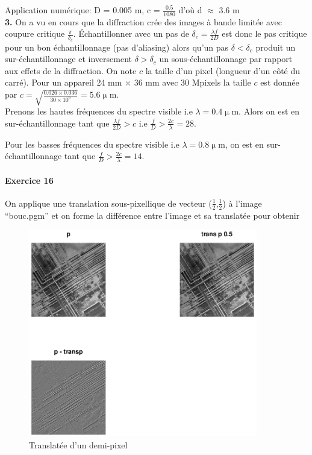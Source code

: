 \documentclass[a4paper, 11pt]{article}
\begin{document}
Application numérique: D = 0.005 m, c = $\frac{0.5}{1080}$ d'où d $\approx$ 3.6 m \\

\textbf{3.} On a vu en cours que la diffraction crée des images à bande limitée avec coupure critique
$\frac{\pi}{\delta_c}$. Échantillonner avec un pas de $\delta_c = \frac{\lambda f}{2D}$ est donc le pas critique pour un
bon échantillonnage (pas d'aliasing) alors qu'un pas $\delta < \delta_c$ produit un sur-échantillonnage et inversement
$\delta > \delta_c$ un sous-échantillonnage par rapport aux effets de la diffraction. On note $c$ la taille d'un pixel 
(longueur d'un côté du carré). Pour un appareil 24 mm $\times$ 36 mm avec 30 Mpixels la taille $c$ est donnée par $c =
\sqrt{\frac{0.026\times0.036}{30\times10^6}} = 5.6 \upmu\text{m}$. \\

Prenons les hautes fréquences du spectre visible i.e $\lambda = 0.4 \upmu\text{m}$. Alors on est en sur-échantillonnage
tant que $\frac{\lambda f}{2D} > c$ i.e $\frac{f}{D} > \frac{2c}{\lambda} = 28$. 

Pour les basses fréquences du spectre visible i.e $\lambda = 0.8 \upmu\text{m}$, on est en sur-échantillonnage
tant que $\frac{f}{D} > \frac{2c}{\lambda} = 14$. \\ 

\paragraph{Exercice 16} On applique une translation sous-pixellique de vecteur ($\frac{1}{2}$,$\frac{1}{2}$) à l'image
“bouc.pgm” et on forme la différence entre l'image et sa translatée pour obtenir

\begin{figure}[!h]
  \centering
  \includegraphics[width=10cm]{bouc_p_ffttrans.png}
  \caption{Translatée d'un demi-pixel}
  \label{fig:bouc_0.5}
\end{figure}
\end{document}
